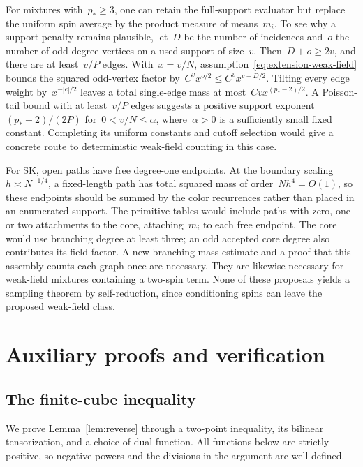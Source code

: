 \documentclass[10pt]{article}
\theoremstyle{plain}
\theoremstyle{definition}
\theoremstyle{remark}
\begin{document}
For mixtures with~$p_*\ge3$, one can retain the full-support evaluator but replace the uniform spin average by the product measure of means~$m_i$. To see why a support penalty remains plausible, let~$D$ be the number of incidences and~$o$ the number of odd-degree vertices on a used support of size~$v$. Then~$D+o\ge2v$, and there are at least~$v/P$ edges. With~$x=v/N$, assumption~\eqref{eq:extension-weak-field} bounds the squared odd-vertex factor by~$C^v x^{o/2}\le C^v x^{v-D/2}$. Tilting every edge weight by~$x^{-|e|/2}$ leaves a total single-edge mass at most~$Cv x^{(p_*-2)/2}$. A Poisson-tail bound with at least~$v/P$ edges suggests a positive support exponent~$(p_*-2)/(2P)$ for~$0<v/N\le\alpha$, where~$\alpha>0$ is a sufficiently small fixed constant. Completing its uniform constants and cutoff selection would give a concrete route to deterministic weak-field counting in this case.

For SK, open paths have free degree-one endpoints. At the boundary scaling~$h\asymp N^{-1/4}$, a fixed-length path has total squared mass of order~$Nh^4=O(1)$, so these endpoints should be summed by the color recurrences rather than placed in an enumerated support. The primitive tables would include paths with zero, one or two attachments to the core, attaching~$m_i$ to each free endpoint. The core would use branching degree at least three; an odd accepted core degree also contributes its field factor. A new branching-mass estimate and a proof that this assembly counts each graph once are necessary. They are likewise necessary for weak-field mixtures containing a two-spin term. None of these proposals yields a sampling theorem by self-reduction, since conditioning spins can leave the proposed weak-field class.


\appendix
\section{Auxiliary proofs and verification}\label{app:consequences}

\subsection{The finite-cube inequality}\label{app:reverse-proof}
We prove Lemma~\ref{lem:reverse} through a two-point inequality, its bilinear tensorization, and a choice of dual function. All functions below are strictly positive, so negative powers and the divisions in the argument are well defined.
\end{document}
